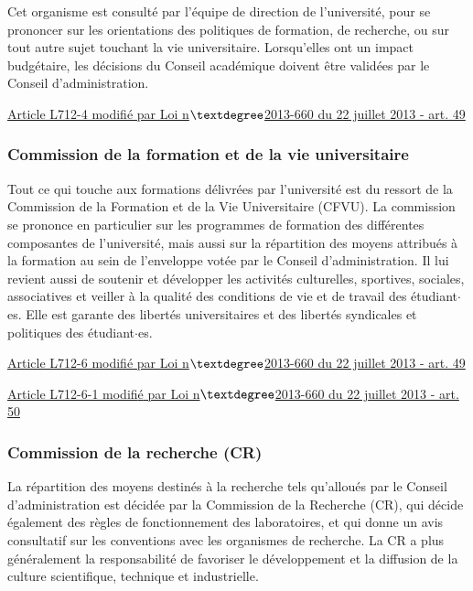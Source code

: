 Cet organisme est consult\'e par l'\'equipe de direction de l'universit\'e, pour se prononcer sur les orientations des politiques de formation, de recherche, ou sur tout autre sujet touchant la vie universitaire. Lorsqu'elles ont un impact budg\'etaire, les d{\'e}cisions du Conseil acad{\'e}mique doivent \^etre valid\'ees par le Conseil d'administration. 

\href{https://www.legifrance.gouv.fr/affichCodeArticle.do;jsessionid=C8BFF801F2976E9272297AB33338C553.tpdila14v_3?idArticle=LEGIARTI000027747976&cidTexte=LEGITEXT000006071191&dateTexte=20170113}{Article L712-4 modifi\'e par Loi n$\textdegree$2013-660 du 22 juillet 2013 - art. 49}


\subsubsection*{Commission de la formation et de la vie universitaire}
Tout ce qui touche aux formations d\'elivr\'ees par l'universit\'e est du ressort de la Commission de la Formation et de la Vie Universitaire (CFVU). La commission se prononce en particulier sur les programmes de formation des diff\'erentes composantes de l'universit\'e, mais aussi sur la r{\'e}partition des moyens attribu\'es \`a la formation au sein de l'enveloppe vot\'ee par le Conseil d'administration. Il lui revient aussi de soutenir et d\'evelopper les activit{\'e}s culturelles, sportives, sociales, associatives et veiller \`a la qualit\'e des conditions de vie et de travail des {\'e}tudiant$\cdot$es. Elle est garante des libert{\'e}s universitaires et des libert{\'e}s syndicales et politiques des {\'e}tudiant$\cdot$es. 

\href{https://www.legifrance.gouv.fr/affichCodeArticle.do;jsessionid=C8BFF801F2976E9272297AB33338C553.tpdila14v_3?idArticle=LEGIARTI000027747967&cidTexte=LEGITEXT000006071191&dateTexte=20170113}{Article L712-6 modifi{\'e} par Loi n$\textdegree$2013-660 du 22 juillet 2013 - art. 49}

\href{https://www.legifrance.gouv.fr/affichCodeArticle.do;jsessionid=C8BFF801F2976E9272297AB33338C553.tpdila14v_3?idArticle=LEGIARTI000027747991&cidTexte=LEGITEXT000006071191&dateTexte=20170113}{Article L712-6-1 modifi{\'e} par Loi n$\textdegree$2013-660 du 22 juillet 2013 - art. 50}

\subsubsection*{Commission de la recherche (CR)}
La r\'epartition des moyens destin{\'e}s \`a la recherche tels qu'allou{\'e}s par le Conseil d'administration est d\'ecid\'ee par la Commission de la Recherche (CR), qui d\'ecide \'egalement des r{\`e}gles de fonctionnement des laboratoires, et qui donne un avis consultatif sur les conventions avec les organismes de recherche. La CR a plus g\'en\'eralement la responsabilit\'e de favoriser le d\'eveloppement et la diffusion de la culture scientifique, technique et industrielle.

